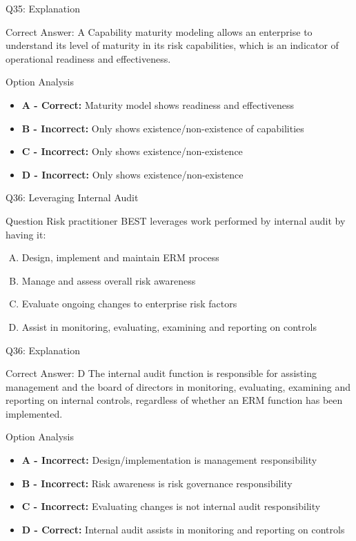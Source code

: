 \documentclass{beamer}
\begin{document}
	\begin{frame}{Q35: Explanation}
		\begin{block}{Correct Answer: A}
			Capability maturity modeling allows an enterprise to understand its level of maturity in its risk capabilities, which is an indicator of operational readiness and effectiveness.
		\end{block}
		\begin{block}{Option Analysis}
			\begin{itemize}
				\item \textbf{A - Correct:} Maturity model shows readiness and effectiveness
				\item \textbf{B - Incorrect:} Only shows existence/non-existence of capabilities
				\item \textbf{C - Incorrect:} Only shows existence/non-existence
				\item \textbf{D - Incorrect:} Only shows existence/non-existence
			\end{itemize}
		\end{block}
	\end{frame}
	
	\begin{frame}{Q36: Leveraging Internal Audit}
		\begin{block}{Question}
			Risk practitioner BEST leverages work performed by internal audit by having it:
		\end{block}
		\begin{enumerate}[(A)]
			\item Design, implement and maintain ERM process
			\item Manage and assess overall risk awareness
			\item Evaluate ongoing changes to enterprise risk factors
			\item Assist in monitoring, evaluating, examining and reporting on controls
		\end{enumerate}
	\end{frame}
	
	\begin{frame}{Q36: Explanation}
		\begin{block}{Correct Answer: D}
			The internal audit function is responsible for assisting management and the board of directors in monitoring, evaluating, examining and reporting on internal controls, regardless of whether an ERM function has been implemented.
		\end{block}
		\begin{block}{Option Analysis}
			\begin{itemize}
				\item \textbf{A - Incorrect:} Design/implementation is management responsibility
				\item \textbf{B - Incorrect:} Risk awareness is risk governance responsibility
				\item \textbf{C - Incorrect:} Evaluating changes is not internal audit responsibility
				\item \textbf{D - Correct:} Internal audit assists in monitoring and reporting on controls
			\end{itemize}
		\end{block}
	\end{frame}
	
\end{document}
